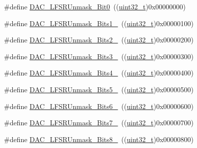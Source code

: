 \begin{DoxyCompactItemize}
\#define \hyperlink{group___d_a_c__lfsrunmask__triangleamplitude_ga60794fd5092a332cfa82e1cee13945fc}{D\+A\+C\+\_\+\+L\+F\+S\+R\+Unmask\+\_\+\+Bit0}~((\hyperlink{_p_e___types_8h_a33594304e786b158f3fb30289278f5af}{uint32\+\_\+t})0x00000000)
\item 
\#define \hyperlink{group___d_a_c__lfsrunmask__triangleamplitude_ga09f47cfa563252a1add4662284350c07}{D\+A\+C\+\_\+\+L\+F\+S\+R\+Unmask\+\_\+\+Bits1\+\_}~((\hyperlink{_p_e___types_8h_a33594304e786b158f3fb30289278f5af}{uint32\+\_\+t})0x00000100)
\item 
\#define \hyperlink{group___d_a_c__lfsrunmask__triangleamplitude_ga60b800857b7e33d9c0be2846fc56849f}{D\+A\+C\+\_\+\+L\+F\+S\+R\+Unmask\+\_\+\+Bits2\+\_}~((\hyperlink{_p_e___types_8h_a33594304e786b158f3fb30289278f5af}{uint32\+\_\+t})0x00000200)
\item 
\#define \hyperlink{group___d_a_c__lfsrunmask__triangleamplitude_gafe219362b3a48d8678a65ef38cb45532}{D\+A\+C\+\_\+\+L\+F\+S\+R\+Unmask\+\_\+\+Bits3\+\_}~((\hyperlink{_p_e___types_8h_a33594304e786b158f3fb30289278f5af}{uint32\+\_\+t})0x00000300)
\item 
\#define \hyperlink{group___d_a_c__lfsrunmask__triangleamplitude_ga2543d802e19d592a26c8231be663cdac}{D\+A\+C\+\_\+\+L\+F\+S\+R\+Unmask\+\_\+\+Bits4\+\_}~((\hyperlink{_p_e___types_8h_a33594304e786b158f3fb30289278f5af}{uint32\+\_\+t})0x00000400)
\item 
\#define \hyperlink{group___d_a_c__lfsrunmask__triangleamplitude_ga71a01660d410823bfe76a603080dc125}{D\+A\+C\+\_\+\+L\+F\+S\+R\+Unmask\+\_\+\+Bits5\+\_}~((\hyperlink{_p_e___types_8h_a33594304e786b158f3fb30289278f5af}{uint32\+\_\+t})0x00000500)
\item 
\#define \hyperlink{group___d_a_c__lfsrunmask__triangleamplitude_ga48fe2d3f4274d6bf28e446ca0001ed5d}{D\+A\+C\+\_\+\+L\+F\+S\+R\+Unmask\+\_\+\+Bits6\+\_}~((\hyperlink{_p_e___types_8h_a33594304e786b158f3fb30289278f5af}{uint32\+\_\+t})0x00000600)
\item 
\#define \hyperlink{group___d_a_c__lfsrunmask__triangleamplitude_gaf0a93c1ee1e13776fae7558b36243431}{D\+A\+C\+\_\+\+L\+F\+S\+R\+Unmask\+\_\+\+Bits7\+\_}~((\hyperlink{_p_e___types_8h_a33594304e786b158f3fb30289278f5af}{uint32\+\_\+t})0x00000700)
\item 
\#define \hyperlink{group___d_a_c__lfsrunmask__triangleamplitude_ga4f56965841d9d91ca5b6de43ee589598}{D\+A\+C\+\_\+\+L\+F\+S\+R\+Unmask\+\_\+\+Bits8\+\_}~((\hyperlink{_p_e___types_8h_a33594304e786b158f3fb30289278f5af}{uint32\+\_\+t})0x00000800)
\item 

\end{DoxyCompactItemize}
